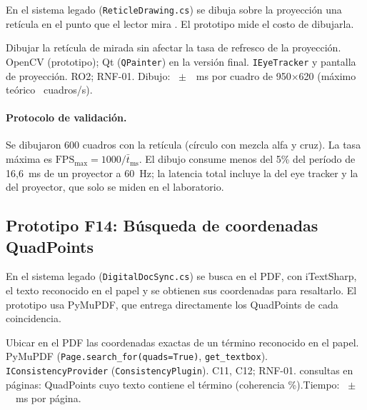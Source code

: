 En el sistema legado (\texttt{ReticleDrawing.cs}) se dibuja sobre la proyección una retícula en el punto que el lector mira \citep{estay2020}. El prototipo mide el costo de dibujarla.

{Dibujar la retícula de mirada sin afectar la tasa de refresco de la proyección.}
{OpenCV (prototipo); Qt (\texttt{QPainter}) en la versión final.}
{\texttt{IEyeTracker} y pantalla de proyección.}
{RO2; RNF-01.}
{ Dibujo: \FTreceTiempoMs~$\pm$~\FTreceTiempoSdMs~ms por cuadro de 950$\times$620 (máximo teórico \FTreceFpsMax~cuadros/s).\newline {}}

\paragraph{Protocolo de validación.} Se dibujaron 600 cuadros con la retícula (círculo con mezcla alfa y cruz). La tasa máxima es $\mathrm{FPS}_{\max}=1000/\bar{t}_{\text{ms}}$. El dibujo consume menos del 5\% del período de 16,6~ms de un proyector a 60~Hz; la latencia total incluye la del eye tracker y la del proyector, que solo se miden en el laboratorio.

\subsection{Prototipo F14: Búsqueda de coordenadas QuadPoints}

En el sistema legado (\texttt{DigitalDocSync.cs}) se busca en el PDF, con iTextSharp, el texto reconocido en el papel y se obtienen sus coordenadas para resaltarlo. El prototipo usa PyMuPDF, que entrega directamente los QuadPoints de cada coincidencia.

{Ubicar en el PDF las coordenadas exactas de un término reconocido en el papel.}
{PyMuPDF (\texttt{Page.search\_for(quads=True)}, \texttt{get\_textbox}).}
{\texttt{IConsistencyProvider} (\texttt{ConsistencyPlugin}).}
{C11, C12; RNF-01.}
{ \FCatorceConsultas{} consultas en \FCatorcePaginas{} páginas: \FCatorceCoincidencias{} QuadPoints cuyo texto contiene el término (coherencia \FCatorceCoherenciaPct\%).\newline Tiempo: \FCatorceTiempoMs~$\pm$~\FCatorceTiempoSdMs~ms por página.}

